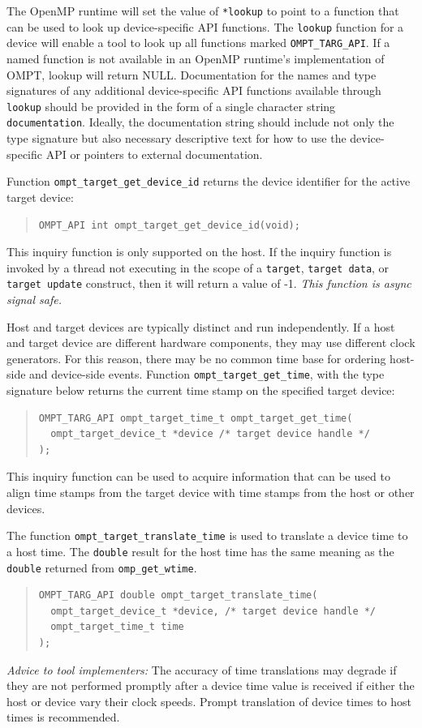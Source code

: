 \documentclass{article}
\begin{document}
The OpenMP runtime will set the value of \verb|*lookup| to point to a function that can be used to look up device-specific API functions.  The \verb|lookup| function for a device will enable a tool to look up all functions marked \verb|OMPT_TARG_API|.  If a named function is not available in an OpenMP runtime's implementation of OMPT, lookup will return NULL. Documentation for the names and type signatures of any additional device-specific API functions available through \verb|lookup| should be provided in the form of a single character string \verb|documentation|. Ideally, the documentation string should include not only the type signature but also necessary descriptive text for how to use the device-specific API or pointers to external documentation.

Function \verb|ompt_target_get_device_id| returns the device identifier for the active target device:
\begin{quote}
\begin{verbatim}
OMPT_API int ompt_target_get_device_id(void);
\end{verbatim}
\end{quote}
This inquiry function is only supported on the host. If the inquiry function is invoked by a thread not executing in the scope of a {\tt target}, {\tt target data}, or {\tt target update} construct, then it will return a value of -1. {\it This function is async signal safe.}

Host and target devices are typically distinct and run independently. If a
host and target device are different hardware components, they may 
use different clock generators. For this reason,  there may be no common time base for ordering host-side and device-side events.
Function \verb|ompt_target_get_time|, with the type signature below returns the current time stamp on the specified target device:
\begin{quote}
\begin{verbatim}
OMPT_TARG_API ompt_target_time_t ompt_target_get_time(
  ompt_target_device_t *device /* target device handle */
);
\end{verbatim}
\end{quote}
This inquiry function can be used
to acquire information that can be used to align time stamps from the target device with time
stamps from the host or other devices.

The function \verb|ompt_target_translate_time| is used to translate a device time to a host time. The {\tt double} result for the host time has the same meaning as the {\tt double} returned from \verb|omp_get_wtime|.
\begin{quote}
\begin{verbatim}
OMPT_TARG_API double ompt_target_translate_time(
  ompt_target_device_t *device, /* target device handle */
  ompt_target_time_t time
);
\end{verbatim}
\end{quote}
\noindent
{\em Advice to tool implementers:} The accuracy of time translations may degrade if they are not performed promptly after a device time value is received if either the host or device vary their clock speeds. Prompt translation of device times to host times is recommended.
\end{document}
